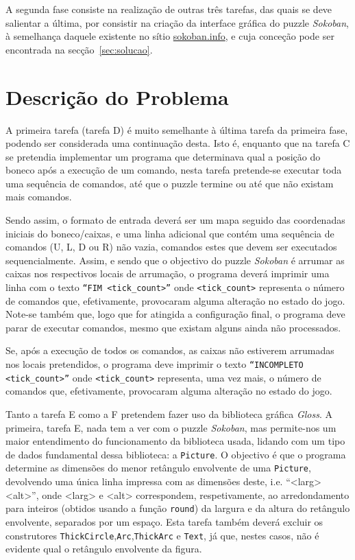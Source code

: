 \documentclass[a4paper]{article}
\begin{document}
A segunda fase consiste na realização de outras três tarefas, das quais se deve salientar a última, por consistir na criação da interface gráfica do puzzle \emph{Sokoban}, à semelhança daquele existente no sítio \href{http://sokoban.info}{sokoban.info}, e cuja conceção pode ser encontrada na secção~\ref{sec:solucao}.

\section{Descrição do Problema}
\label{sec:problema}

A primeira tarefa (tarefa D) é muito semelhante à última tarefa da primeira fase, podendo ser considerada uma continuação desta. Isto é, enquanto que na tarefa C se pretendia implementar um programa que determinava qual a posição do boneco após a execução de um comando, nesta tarefa pretende-se executar toda uma sequência de comandos, até que o puzzle termine ou até que não existam mais comandos.

Sendo assim, o formato de entrada deverá ser um mapa seguido das coordenadas iniciais do boneco/caixas, e uma linha adicional que contém uma sequência de comandos (U, L, D ou R) não vazia, comandos estes que devem ser executados sequencialmente. Assim, e sendo que o objectivo do puzzle \emph{Sokoban} é arrumar as caixas nos respectivos locais de arrumação, o programa deverá imprimir uma linha com o texto \texttt{``FIM <tick\_count>''} onde \texttt{<tick\_count>} representa o número de comandos que, efetivamente, provocaram alguma alteração no estado do jogo. Note-se também que, logo que for atingida a configuração final, o programa deve parar de executar comandos, mesmo que existam alguns ainda não processados.

Se, após a execução de todos os comandos, as caixas não estiverem arrumadas nos locais pretendidos, o programa deve imprimir o texto \texttt{``INCOMPLETO <tick\_count>''} onde \texttt{<tick\_count>} representa, uma vez mais, o número de comandos que, efetivamente, provocaram alguma alteração no estado do jogo.

Tanto a tarefa E como a F pretendem fazer uso da biblioteca gráfica \emph{Gloss}. A primeira, tarefa E, nada tem a ver com o puzzle \emph{Sokoban}, mas permite-nos um maior entendimento do funcionamento da biblioteca usada, lidando com um tipo de dados fundamental dessa biblioteca: a \texttt{Picture}. O objectivo é que o programa determine as dimensões do menor retângulo envolvente de uma \texttt{Picture}, devolvendo uma única linha impressa com as dimensões deste, i.e. ``<larg> <alt>'', onde <larg> e <alt> correspondem, respetivamente, ao arredondamento para inteiros (obtidos usando a função \texttt{round}) da largura e da altura do retângulo envolvente, separados por um espaço. Esta tarefa também deverá excluir os construtores \texttt{ThickCircle},\texttt{Arc},\texttt{ThickArc} e \texttt{Text}, já que, nestes casos, não é evidente qual o retângulo envolvente da figura.
\end{document}
